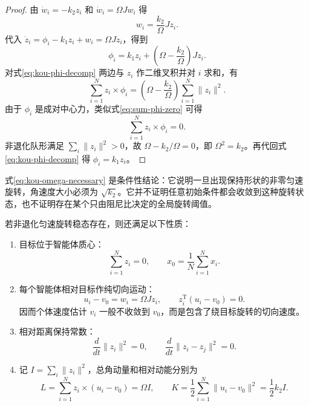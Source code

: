 \begin{proof}
由 $\dot{w}_i=-k_2z_i$ 和 $\dot{w}_i=\Omega Jw_i$ 得
\begin{equation}
w_i=\frac{k_2}{\Omega}Jz_i .
\end{equation}
代入 $\dot{z}_i=\phi_i-k_1z_i+w_i=\Omega Jz_i$，得到
\begin{equation}
\phi_i=k_1z_i+\left(\Omega-\frac{k_2}{\Omega}\right)Jz_i . \label{eq:kou-phi-decomp}
\end{equation}
对式\eqref{eq:kou-phi-decomp} 两边与 $z_i$ 作二维叉积并对 $i$ 求和，有
\begin{equation}
\sum_{i=1}^Nz_i\times\phi_i
=\left(\Omega-\frac{k_2}{\Omega}\right)\sum_{i=1}^N\|z_i\|^2 .
\end{equation}
由于 $\phi_i$ 是成对中心力，类似式\eqref{eq:sum-phi-zero} 可得
\begin{equation}
\sum_{i=1}^Nz_i\times\phi_i=0.
\end{equation}
非退化队形满足 $\sum_i\|z_i\|^2>0$，故 $\Omega-k_2/\Omega=0$，即 $\Omega^2=k_2$。再代回式\eqref{eq:kou-phi-decomp} 得 $\phi_i=k_1z_i$。
\end{proof}

\begin{remark}
式\eqref{eq:kou-omega-necessary} 是条件性结论：它说明一旦出现保持形状的非零匀速旋转，角速度大小必须为 $\sqrt{k_2}$。它并不证明任意初始条件都会收敛到这种旋转状态，也不证明存在某个只由阻尼比决定的全局旋转阈值。
\end{remark}

\begin{theorem}[旋转稳态的附加性质]
若非退化匀速旋转稳态存在，则还满足以下性质：
\begin{enumerate}
    \item 目标位于智能体质心：
    \begin{equation}
    \sum_{i=1}^N z_i=0,\qquad x_0=\frac{1}{N}\sum_{i=1}^N x_i .
    \end{equation}
    \item 每个智能体相对目标作纯切向运动：
    \begin{equation}
    u_i-v_0=w_i=\Omega Jz_i,\qquad z_i^\mathrm{T}(u_i-v_0)=0 .
    \end{equation}
    因而个体速度估计 $v_i$ 一般不收敛到 $v_0$，而是包含了绕目标旋转的切向速度。
    \item 相对距离保持常数：
    \begin{equation}
    \frac{d}{dt}\|z_i\|^2=0,\qquad
    \frac{d}{dt}\|z_i-z_j\|^2=0 .
    \end{equation}
    \item 记 $I=\sum_i\|z_i\|^2$，总角动量和相对动能分别为
    \begin{equation}
    L=\sum_{i=1}^Nz_i\times(u_i-v_0)=\Omega I,\qquad
    K=\frac{1}{2}\sum_{i=1}^N\|u_i-v_0\|^2=\frac{1}{2}k_2 I .
    \end{equation}
\end{enumerate}
\end{theorem}

